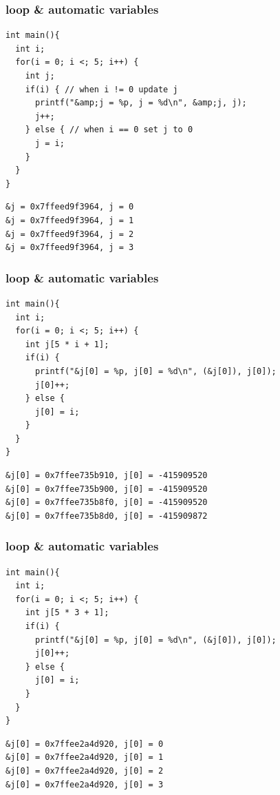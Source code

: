 \documentclass{../c-lecture}
\begin{document}
\begin{frame}[fragile]
  \frametitle{loop \& automatic variables}
  \begin{verbatim}
int main(){
  int i;
  for(i = 0; i <; 5; i++) {
    int j;
    if(i) { // when i != 0 update j
      printf("&amp;j = %p, j = %d\n", &amp;j, j);
      j++;
    } else { // when i == 0 set j to 0
      j = i;
    }
  }
}
  \end{verbatim}
\end{frame}

\begin{frame}[fragile]
  \begin{verbatim}
&j = 0x7ffeed9f3964, j = 0
&j = 0x7ffeed9f3964, j = 1
&j = 0x7ffeed9f3964, j = 2
&j = 0x7ffeed9f3964, j = 3
  \end{verbatim}
\end{frame}

\begin{frame}[fragile]
  \frametitle{loop \& automatic variables}
  \begin{verbatim}
int main(){
  int i;
  for(i = 0; i <; 5; i++) {
    int j[5 * i + 1];
    if(i) {
      printf("&j[0] = %p, j[0] = %d\n", (&j[0]), j[0]);
      j[0]++;
    } else {
      j[0] = i;
    }
  }
}
  \end{verbatim}
\end{frame}

\begin{frame}[fragile]
  \begin{verbatim}
&j[0] = 0x7ffee735b910, j[0] = -415909520
&j[0] = 0x7ffee735b900, j[0] = -415909520
&j[0] = 0x7ffee735b8f0, j[0] = -415909520
&j[0] = 0x7ffee735b8d0, j[0] = -415909872
  \end{verbatim}
\end{frame}

\begin{frame}[fragile]
  \frametitle{loop \& automatic variables}
  \begin{verbatim}
int main(){
  int i;
  for(i = 0; i <; 5; i++) {
    int j[5 * 3 + 1];
    if(i) {
      printf("&j[0] = %p, j[0] = %d\n", (&j[0]), j[0]);
      j[0]++;
    } else {
      j[0] = i;
    }
  }
}
  \end{verbatim}
\end{frame}

\begin{frame}[fragile]
  \begin{verbatim}
&j[0] = 0x7ffee2a4d920, j[0] = 0
&j[0] = 0x7ffee2a4d920, j[0] = 1
&j[0] = 0x7ffee2a4d920, j[0] = 2
&j[0] = 0x7ffee2a4d920, j[0] = 3
  \end{verbatim}
\end{frame}
\end{document}
